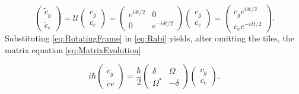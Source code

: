 \begin{equation}\label{eq:RotatingFrame}
	\begin{pmatrix}
		\tilde{c}_g \\ 
		\tilde{c}_e
	\end{pmatrix} =
	\mathcal{U}
	\begin{pmatrix}
		c_g \\
		c_e
	\end{pmatrix} =
	\begin{pmatrix}
		e^{i \delta t/2} & 0\\
		0 & e^{-i \delta t/2}
	\end{pmatrix}
	\begin{pmatrix}
		c_g \\
		c_e
	\end{pmatrix} =
	\begin{pmatrix}
		c_g e^{i\delta t/2}\\
		c_e e^{-i \delta t/2}
	\end{pmatrix}.
\end{equation}
Substituting \cref{eq:RotatingFrame} in \cref{eq:Rabi} yields, after omitting the tiles, the matrix equation \cref{eq:MatrixEvolution}

\begin{equation}
	i \hbar \begin{pmatrix}
		\dot{c}_g \\ 
		\dot{c}e
	\end{pmatrix}
	= \frac{\hbar}{2} \begin{pmatrix}
		\delta & \Omega \\ \Omega^* & -\delta 
	\end{pmatrix} 
	\begin{pmatrix}
		c_g \\ c_e
	\end{pmatrix}.
\end{equation}








